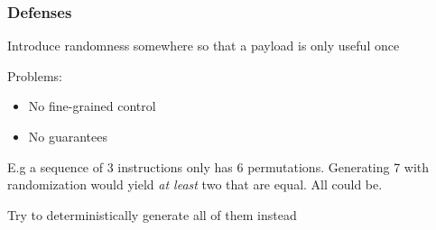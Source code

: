 \begin{frame}
	\frametitle{Defenses}

	Introduce randomness somewhere so that a payload is only useful once

	\vspace{0.5cm}

	Problems:
	\begin{itemize}
		\item No fine-grained control
		\item No guarantees
	\end{itemize}

	\vspace{0.5cm}

	E.g a sequence of 3 instructions only has 6 permutations. Generating 7 with randomization
	would yield \textit{at least} two that are equal. All could be.
	\vspace{0.5cm}

	Try to deterministically generate all of them instead

\end{frame}
